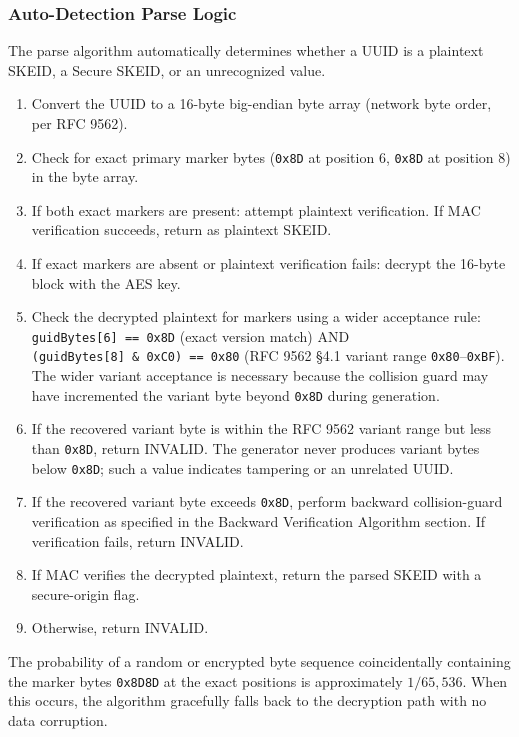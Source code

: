 \documentclass[fleqn,10pt,lineno]{wlpeerj}
\providecommand{\tightlist}{%
  \setlength{\itemsep}{0pt}\setlength{\parskip}{0pt}}
\begin{document}
\subsubsection{Auto-Detection Parse
Logic}\label{auto-detection-parse-logic}

The parse algorithm automatically determines whether a UUID is a
plaintext SKEID, a Secure SKEID, or an unrecognized value.

\begin{enumerate}
\def\labelenumi{\arabic{enumi}.}
\tightlist
\item
  Convert the UUID to a 16-byte big-endian byte array (network byte
  order, per RFC 9562).
\item
  Check for exact primary marker bytes (\texttt{0x8D} at position 6,
  \texttt{0x8D} at position 8) in the byte array.
\item
  If both exact markers are present: attempt plaintext verification. If
  MAC verification succeeds, return as plaintext SKEID.
\item
  If exact markers are absent or plaintext verification fails: decrypt
  the 16-byte block with the AES key.
\item
  Check the decrypted plaintext for markers using a wider acceptance
  rule: \texttt{guidBytes{[}6{]}\ ==\ 0x8D} (exact version match) AND
  \texttt{(guidBytes{[}8{]}\ \&\ 0xC0)\ ==\ 0x80} (RFC 9562 §4.1 variant
  range \texttt{0x80}--\texttt{0xBF}). The wider variant acceptance is
  necessary because the collision guard may have incremented the variant
  byte beyond \texttt{0x8D} during generation.
\item
  If the recovered variant byte is within the RFC 9562 variant range but
  less than \texttt{0x8D}, return INVALID. The generator never produces
  variant bytes below \texttt{0x8D}; such a value indicates tampering or
  an unrelated UUID.
\item
  If the recovered variant byte exceeds \texttt{0x8D}, perform backward
  collision-guard verification as specified in the Backward Verification
  Algorithm section. If verification fails, return INVALID.
\item
  If MAC verifies the decrypted plaintext, return the parsed SKEID with
  a secure-origin flag.
\item
  Otherwise, return INVALID.
\end{enumerate}

The probability of a random or encrypted byte sequence coincidentally
containing the marker bytes \texttt{0x8D8D} at the exact positions is
approximately \(1/65{,}536\). When this occurs, the algorithm gracefully
falls back to the decryption path with no data corruption.
\end{document}
